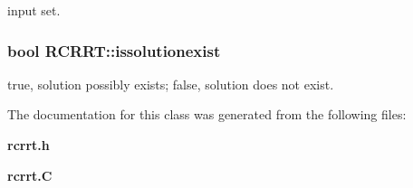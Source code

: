 input set.

\subsubsection{\setlength{\rightskip}{0pt plus 5cm}bool RCRRT::issolutionexist}\label{classRCRRT_m2}


true, solution possibly exists; false, solution does not exist.



The documentation for this class was generated from the following files:\begin{CompactItemize}
\item 
{\bf rcrrt.h}\item 
{\bf rcrrt.C}\end{CompactItemize}
